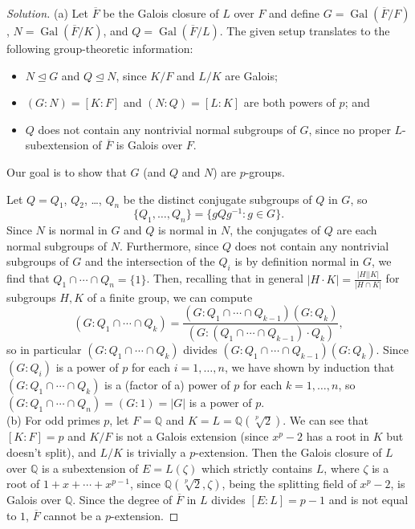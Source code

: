 \documentclass[10pt]{article}
\providecommand{\ol}{\overline}
\providecommand{\Gal}{\operatorname{Gal}}
\providecommand{\QQ}{\mathbb Q}
\providecommand{\ii}{\item}
\providecommand{\inv}{^{-1}}
\newenvironment{soln}{\begin{proof}[Solution]}{\end{proof}}
\providecommand{\abs}[1]{\left\lvert #1\right\rvert}
\begin{document}
\begin{soln}
    (a)
    Let $\ol F$ be the Galois closure of $L$ over $F$
    and define $G = \Gal(\ol F/F)$,
    $N = \Gal(\ol F/K)$, and $Q = \Gal(\ol F/L)$.
    The given setup translates to the following
    group-theoretic information:
    \begin{itemize}
	\ii $N\trianglelefteq G$ and $Q\trianglelefteq N$,
	since $K/F$ and $L/K$ are Galois;
	\ii $(G:N) = [K:F]$ and $(N:Q) = [L:K]$ are both powers of $p$; and
	\ii $Q$ does not contain any nontrivial normal subgroups of $G$,
	since no proper $L$-subextension of $\ol F$ is Galois over $F$.
    \end{itemize}
    Our goal is to show that $G$ (and $Q$ and $N$) are $p$-groups.

    Let $Q = Q_1$, $Q_2$, \dots, $Q_n$ be the distinct
    conjugate subgroups of $Q$ in $G$, so
    \[
	\{Q_1,\dots,Q_n\} = \{gQg\inv : g\in G\}.
    \]
    Since $N$ is normal in $G$ and $Q$ is normal in $N$,
    the conjugates of $Q$ are each normal subgroups of $N$.
    Furthermore, since $Q$ does not contain any nontrivial subgroups of $G$
    and the intersection of the $Q_i$ is by definition
    normal in $G$, we find that $Q_1\cap\cdots\cap Q_n = \{1\}$.
    Then, recalling that in general
    $\abs{H\cdot K} = \frac{\abs H\abs K}{\abs{H\cap K}}$
    for subgroups $H,K$ of a finite group, we can compute
    \begin{equation*}
	(G : Q_1\cap\cdots\cap Q_k)
	= \frac{(G : Q_1\cap\cdots\cap Q_{k-1})(G : Q_k)}
	{(G:(Q_1\cap\cdots\cap Q_{k-1})\cdot Q_k)},
    \end{equation*}
    so in particular $(G:Q_1\cap\cdots\cap Q_k)$
    divides $(G:Q_1\cap\cdots\cap Q_{k-1})(G:Q_k)$.
    Since $(G:Q_i)$ is a power of $p$ for each $i=1,\dots,n$,
    we have shown by induction that $(G:Q_1\cap\cdots\cap Q_k)$
    is a (factor of a) power of $p$ for each $k=1,\dots,n$,
    so $(G:Q_1\cap\cdots\cap Q_n) = (G:1) = \abs G$ is a power of $p$.
    \\

    (b) For odd primes $p$, let $F = \QQ$ and $K = L = \QQ(\sqrt[p]2)$.
    We can see that $[K : F] = p$ and $K/F$ is not a Galois extension
    (since $x^p - 2$ has a root in $K$ but doesn't split),
    and $L/K$ is trivially a $p$-extension.
    Then the Galois closure of $L$ over $\QQ$ is a subextension of
    $E = L(\zeta)$ which strictly contains $L$,
    where $\zeta$ is a root of $1 + x + \cdots + x^{p-1}$,
    since $\QQ(\sqrt[p]2,\zeta)$, being the splitting field of $x^p - 2$,
    is Galois over $\QQ$. Since the degree of $\ol F$ in $L$
    divides $[E : L] = p-1$ and is not equal to $1$,
    $\ol F$ cannot be a $p$-extension.
\end{soln}
\end{document}
